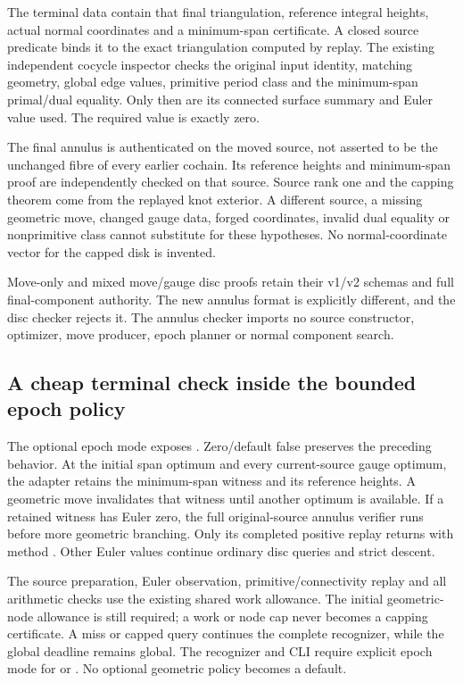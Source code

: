 The terminal  data contain that final
triangulation, reference integral heights, actual normal coordinates and a
minimum-span certificate. A closed source predicate binds it to the exact
triangulation computed by replay. The existing independent cocycle inspector
checks the original input identity, matching geometry, global edge values,
primitive period class and the minimum-span primal/dual equality. Only
then are its connected surface summary and Euler value used. The required
value is exactly zero.

The final annulus is authenticated on the moved source, not asserted to be
the unchanged fibre of every earlier cochain. Its reference heights and
minimum-span proof are independently checked on that source. Source rank
one and the capping theorem come from the replayed knot exterior. A different
source, a missing geometric move, changed gauge data, forged coordinates,
invalid dual equality or nonprimitive class cannot substitute for these
hypotheses. No normal-coordinate vector for the capped disk is invented.

Move-only and mixed move/gauge disc proofs retain their v1/v2 schemas and
full final-component authority. The new annulus format is explicitly
different, and the disc checker rejects it. The annulus checker imports no
source constructor, optimizer, move producer, epoch planner or normal
component search.

\subsection{A cheap terminal check inside the bounded epoch policy}

The optional epoch mode exposes . Zero/default false
preserves the preceding behavior. At the initial span optimum and every
current-source gauge optimum, the adapter retains the minimum-span witness
and its reference heights. A geometric move invalidates that witness until
another optimum is available. If a retained witness has Euler zero, the
full original-source annulus verifier runs before more geometric branching.
Only its completed positive replay returns  with method
. Other Euler values continue ordinary disc
queries and strict descent.

The source preparation, Euler observation, primitive/connectivity replay
and all arithmetic checks use the existing shared work allowance. The
initial geometric-node allowance is still required; a work or node cap
never becomes a capping certificate. A miss or capped query continues the
complete recognizer, while the global deadline remains global.
The recognizer and CLI require explicit epoch mode for
 or .
No optional geometric policy becomes a default.

